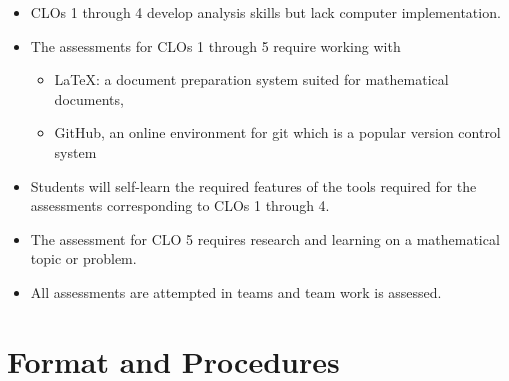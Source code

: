 \documentclass[a4paper]{article}
\begin{document}
\begin{itemize}
\item CLOs 1 through 4 develop analysis skills but lack computer implementation.
\item The assessments for CLOs 1 through 5 require working with
  \begin{itemize}
  \item \LaTeX: a document preparation system suited for mathematical documents,
  \item GitHub, an online environment for git which is a popular version control system
  \end{itemize}
\item Students will self-learn the required features of the tools required for the assessments corresponding to CLOs 1 through 4.
\item The assessment for CLO 5 requires research and learning on a mathematical topic or problem.
\item All assessments are attempted in teams and team work is assessed.
\end{itemize}


\section{Format and Procedures}
\end{document}
